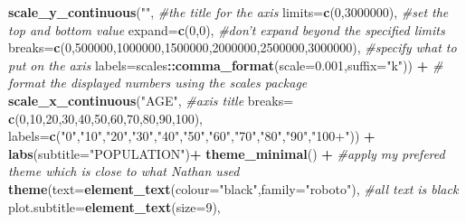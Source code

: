 \documentclass[]{article}
\newenvironment{Shaded}{\begin{snugshade}}{\end{snugshade}}
\newcommand{\KeywordTok}[1]{\textcolor[rgb]{0.13,0.29,0.53}{\textbf{#1}}}
\newcommand{\DataTypeTok}[1]{\textcolor[rgb]{0.13,0.29,0.53}{#1}}
\newcommand{\DecValTok}[1]{\textcolor[rgb]{0.00,0.00,0.81}{#1}}
\newcommand{\FloatTok}[1]{\textcolor[rgb]{0.00,0.00,0.81}{#1}}
\newcommand{\StringTok}[1]{\textcolor[rgb]{0.31,0.60,0.02}{#1}}
\newcommand{\CommentTok}[1]{\textcolor[rgb]{0.56,0.35,0.01}{\textit{#1}}}
\newcommand{\OperatorTok}[1]{\textcolor[rgb]{0.81,0.36,0.00}{\textbf{#1}}}
\newcommand{\NormalTok}[1]{#1}
\begin{document}
\begin{Shaded}
\begin{Highlighting}[]
{\StringTok{  }\KeywordTok{scale_y_continuous}\NormalTok{(}\StringTok{""}\NormalTok{, }\CommentTok{#the title for the axis}
                     \DataTypeTok{limits=}\KeywordTok{c}\NormalTok{(}\DecValTok{0}\NormalTok{,}\DecValTok{3000000}\NormalTok{), }\CommentTok{#set the top and bottom value}
                     \DataTypeTok{expand=}\KeywordTok{c}\NormalTok{(}\DecValTok{0}\NormalTok{,}\DecValTok{0}\NormalTok{), }\CommentTok{#don't expand beyond the specified limits}
                     \DataTypeTok{breaks=}\KeywordTok{c}\NormalTok{(}\DecValTok{0}\NormalTok{,}\DecValTok{500000}\NormalTok{,}\DecValTok{1000000}\NormalTok{,}\DecValTok{1500000}\NormalTok{,}\DecValTok{2000000}\NormalTok{,}\DecValTok{2500000}\NormalTok{,}\DecValTok{3000000}\NormalTok{), }\CommentTok{#specify what to put on the axis}
                     \DataTypeTok{labels=}\NormalTok{scales}\OperatorTok{::}\KeywordTok{comma_format}\NormalTok{(}\DataTypeTok{scale=}\FloatTok{0.001}\NormalTok{,}\DataTypeTok{suffix=}\StringTok{"k"}\NormalTok{)) }\OperatorTok{+}\StringTok{ }\CommentTok{# format the displayed numbers using the scales package}
\StringTok{  }\KeywordTok{scale_x_continuous}\NormalTok{(}\StringTok{"AGE"}\NormalTok{, }\CommentTok{#axis title}
                     \DataTypeTok{breaks=} \KeywordTok{c}\NormalTok{(}\DecValTok{0}\NormalTok{,}\DecValTok{10}\NormalTok{,}\DecValTok{20}\NormalTok{,}\DecValTok{30}\NormalTok{,}\DecValTok{40}\NormalTok{,}\DecValTok{50}\NormalTok{,}\DecValTok{60}\NormalTok{,}\DecValTok{70}\NormalTok{,}\DecValTok{80}\NormalTok{,}\DecValTok{90}\NormalTok{,}\DecValTok{100}\NormalTok{),}
                     \DataTypeTok{labels=}\KeywordTok{c}\NormalTok{(}\StringTok{"0"}\NormalTok{,}\StringTok{"10"}\NormalTok{,}\StringTok{"20"}\NormalTok{,}\StringTok{"30"}\NormalTok{,}\StringTok{"40"}\NormalTok{,}\StringTok{"50"}\NormalTok{,}\StringTok{"60"}\NormalTok{,}\StringTok{"70"}\NormalTok{,}\StringTok{"80"}\NormalTok{,}\StringTok{"90"}\NormalTok{,}\StringTok{"100+"}\NormalTok{)) }\OperatorTok{+}
\StringTok{  }\KeywordTok{labs}\NormalTok{(}\DataTypeTok{subtitle=}\StringTok{"POPULATION"}\NormalTok{)}\OperatorTok{+}
\StringTok{  }\KeywordTok{theme_minimal}\NormalTok{() }\OperatorTok{+}\StringTok{ }\CommentTok{#apply my prefered theme which is close to what Nathan used}
\StringTok{  }\KeywordTok{theme}\NormalTok{(}\DataTypeTok{text=}\KeywordTok{element_text}\NormalTok{(}\DataTypeTok{colour=}\StringTok{"black"}\NormalTok{,}\DataTypeTok{family=}\StringTok{"roboto"}\NormalTok{), }\CommentTok{#all text is black}
        \DataTypeTok{plot.subtitle=}\KeywordTok{element_text}\NormalTok{(}\DataTypeTok{size=}\DecValTok{9}\NormalTok{),}
}
\end{Highlighting}
\end{Shaded}
\end{document}
